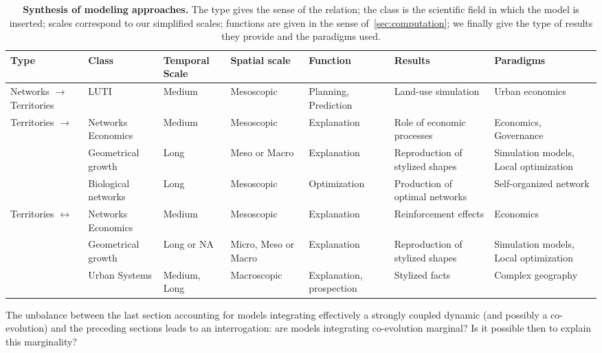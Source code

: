 \documentclass[10pt]{article}
\begin{document}
\begin{table}%
\caption{\textbf{Synthesis of modeling approaches.} The type gives the sense of the relation; the class is the scientific field in which the model is inserted; scales correspond to our simplified scales; functions are given in the sense of~\ref{sec:computation}; we finally give the type of results they provide and the paradigms used.\label{tab:modelingsa:synthesis}}
\begin{tabular}{|p{2.5cm}|p{2cm}|p{2.5cm}|p{2.5cm}|p{2.1cm}|p{2.2cm}|p{2cm}|}
\hline
Type & Class & Temporal Scale & Spatial scale & Function & Results & Paradigms\\ \hline
Networks $\rightarrow$ Territories & LUTI & Medium & Mesoscopic & Planning, Prediction & Land-use simulation & Urban economics \\ \hline
\multirow{3}{*}{Territories $\rightarrow$}& Networks Economics & Medium & Mesoscopic & Explanation & Role of economic processes & Economics, Governance\\\cline{2-7}
Networks& Geometrical growth & Long & Meso or Macro & Explanation & Reproduction of stylized shapes & Simulation models, Local optimization \\\cline{2-7}
& Biological networks & Long & Mesoscopic & Optimization & Production of optimal networks & Self-organized network \\ \hline
\multirow{2}{*}{Territories $\leftrightarrow$}& Networks Economics & Medium & Mesoscopic & Explanation & Reinforcement effects & Economics\\\cline{2-7}
Networks & Geometrical growth & Long or NA & Micro, Meso or Macro & Explanation & Reproduction of stylized shapes & Simulation models, Local optimization \\\cline{2-7}
& Urban Systems & Medium, Long & Macroscopic & Explanation, prospection & Stylized facts & Complex geography\\\hline
\end{tabular}
\end{table}




The unbalance between the last section accounting for models integrating effectively a strongly coupled dynamic (and possibly a co-evolution) and the preceding sections leads to an interrogation: are models integrating co-evolution marginal? Is it possible then to explain this marginality?
\end{document}
